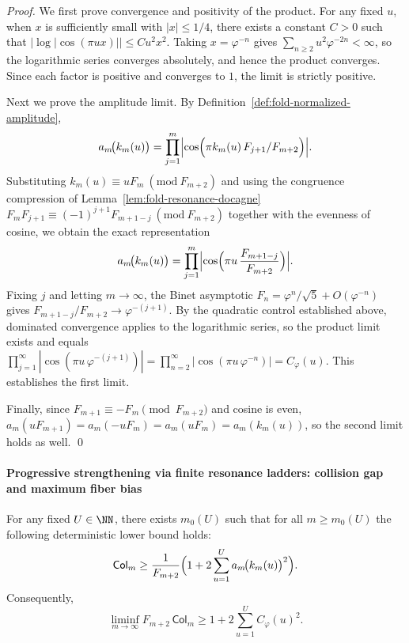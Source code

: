 \begin{proof}
We first prove convergence and positivity of the product.
For any fixed \(u\), when \(x\) is sufficiently small with \(|x|\le 1/4\), there exists a constant \(C>0\) such that
\(
|\log|\cos(\pi u x)||\le C u^2 x^2
\).
Taking \(x=\varphi^{-n}\) gives
\(
\sum_{n\ge 2}u^2\varphi^{-2n}<\infty
\),
so the logarithmic series converges absolutely, and hence the product converges.
Since each factor is positive and converges to \(1\), the limit is strictly positive.
\par
Next we prove the amplitude limit.
By Definition~\ref{def:fold-normalized-amplitude},
\[
a_m\!\bigl(k_m(u)\bigr)
=\prod_{j=1}^{m}\Bigl|\cos\Bigl(\pi k_m(u)\,F_{j+1}/F_{m+2}\Bigr)\Bigr|.
\]
Substituting \(k_m(u)\equiv uF_m\ (\mathrm{mod}\ F_{m+2})\) and using the congruence compression of Lemma~\ref{lem:fold-resonance-docagne}
\(
F_mF_{j+1}\equiv (-1)^{j+1}F_{m+1-j}\ (\mathrm{mod}\ F_{m+2})
\)
together with the evenness of cosine, we obtain the exact representation
\[
a_m\!\bigl(k_m(u)\bigr)
=\prod_{j=1}^{m}\Bigl|\cos\Bigl(\pi u\,\frac{F_{m+1-j}}{F_{m+2}}\Bigr)\Bigr|.
\]
Fixing \(j\) and letting \(m\to\infty\), the Binet asymptotic \(F_n=\varphi^n/\sqrt 5+O(\varphi^{-n})\) gives
\(
F_{m+1-j}/F_{m+2}\to \varphi^{-(j+1)}
\).
By the quadratic control established above, dominated convergence applies to the logarithmic series, so the product limit exists and equals
\(
\prod_{j=1}^{\infty}|\cos(\pi u\,\varphi^{-(j+1)})|
=\prod_{n=2}^{\infty}|\cos(\pi u\,\varphi^{-n})|
=C_\varphi(u)
\).
This establishes the first limit.
\par
Finally, since \(F_{m+1}\equiv -F_m\pmod{F_{m+2}}\) and cosine is even,
\(
a_m(uF_{m+1})=a_m(-uF_m)=a_m(uF_m)=a_m(k_m(u))
\),
so the second limit holds as well. \qed
\end{proof}

\paragraph{Progressive strengthening via finite resonance ladders: collision gap and maximum fiber bias}
\begin{corollary}\label{cor:fold-collision-gap-resonance-ladder-U}
For any fixed \(U\in\NN\), there exists \(m_0(U)\) such that for all \(m\ge m_0(U)\) the following deterministic lower bound holds:
\[
\mathsf{Col}_m
\ge
\frac{1}{F_{m+2}}
\Bigl(1+2\sum_{u=1}^{U}a_m\!\bigl(k_m(u)\bigr)^2\Bigr).
\]
Consequently,
\[
\liminf_{m\to\infty}F_{m+2}\,\mathsf{Col}_m
\ge
1+2\sum_{u=1}^{U}C_\varphi(u)^2.
\]
\end{corollary}

